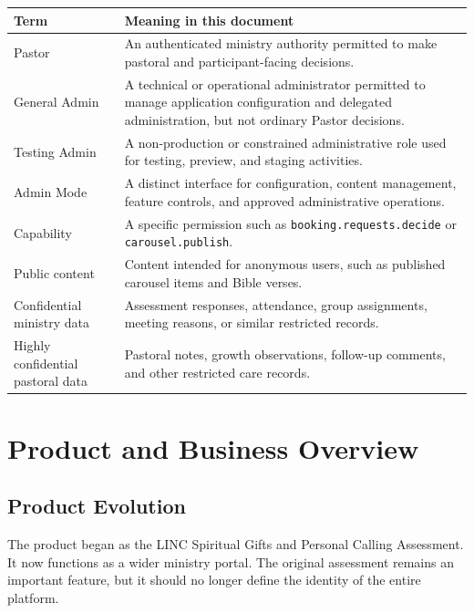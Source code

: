 \documentclass[11pt,a4paper,oneside]{report}
\begin{document}
\begin{paramtable}
\begin{tabularx}{\linewidth}{@{}l X@{}}
\toprule
\textbf{Term} & \textbf{Meaning in this document} \\
\midrule
Pastor & An authenticated ministry authority permitted to make pastoral and participant-facing decisions. \\
General Admin & A technical or operational administrator permitted to manage application configuration and delegated administration, but not ordinary Pastor decisions. \\
Testing Admin & A non-production or constrained administrative role used for testing, preview, and staging activities. \\
Admin Mode & A distinct interface for configuration, content management, feature controls, and approved administrative operations. \\
Capability & A specific permission such as \texttt{booking.requests.decide} or \texttt{carousel.publish}. \\
Public content & Content intended for anonymous users, such as published carousel items and Bible verses. \\
Confidential ministry data & Assessment responses, attendance, group assignments, meeting reasons, or similar restricted records. \\
Highly confidential pastoral data & Pastoral notes, growth observations, follow-up comments, and other restricted care records. \\
\bottomrule
\end{tabularx}
\end{paramtable}

\chapter{Product and Business Overview}

\section{Product Evolution}

The product began as the LINC Spiritual Gifts and Personal Calling Assessment. It now functions as a wider ministry portal. The original assessment remains an important feature, but it should no longer define the identity of the entire platform.
\end{document}
